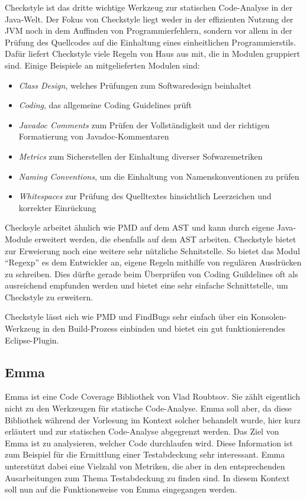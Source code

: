 Checkstyle ist das dritte wichtige Werkzeug zur statischen Code-Analyse in der Java-Welt. Der Fokus von Checkstyle liegt weder in der effizienten Nutzung der JVM noch in dem Auffinden von Programmierfehlern, sondern vor allem in der Prüfung des Quellcodes auf die Einhaltung eines einheitlichen Programmierstils. 
Dafür liefert Checkstyle viele Regeln von Haus aus mit, die in Modulen gruppiert sind. Einige Beispiele an mitgelieferten Modulen sind:
\begin{itemize}
\item \textit{Class Design}, welches Prüfungen zum Softwaredesign beinhaltet
\item \textit{Coding}, das allgemeine Coding Guidelines prüft
\item \textit{Javadoc Comments} zum Prüfen der Vollständigkeit und der richtigen Formatierung von Javadoc-Kommentaren
\item \textit{Metrics} zum Sicherstellen der  Einhaltung diverser Sofwaremetriken
\item \textit{Naming Conventions}, um die Einhaltung von Namenskonventionen zu prüfen
\item \textit{Whitespaces} zur Prüfung des Quelltextes hinsichtlich Leerzeichen und korrekter Einrückung
\end{itemize}
Checksyle arbeitet ähnlich wie PMD auf dem AST und kann durch eigene Java-Module erweitert werden, die ebenfalls auf dem AST arbeiten. Checkstyle bietet zur Erweierung noch eine weitere sehr nützliche Schnitstelle. So bietet das Modul ``Regexp'' es dem Entwickler an, eigene Regeln mithilfe von regulären Ausdrücken zu schreiben. Dies dürfte gerade beim Überprüfen von Coding Guildelines oft als ausreichend empfunden werden und bietet eine sehr einfache Schnittstelle, um Checkstyle zu erweitern.

Checkstyle lässt sich wie PMD und FindBugs sehr einfach über ein Konsolen-Werkzeug in den Build-Prozess einbinden und bietet ein gut funktionierendes Eclipse-Plugin.


\subsection{Emma}

Emma ist eine Code Coverage Bibliothek von Vlad Roubtsov. Sie zählt eigentlich nicht zu den Werkzeugen für statische Code-Analyse. Emma soll aber, da diese Bibliothek während der Vorlesung im Kontext solcher behandelt wurde, hier kurz erläutert und zur statischen Code-Analyse abgegrenzt werden. 
Das Ziel von Emma ist zu analysieren, welcher Code durchlaufen wird. Diese Information ist zum Beispiel für die Ermittlung einer Testabdeckung sehr interessant. Emma unterstützt dabei eine Vielzahl von Metriken, die aber in den entsprechenden Ausarbeitungen zum Thema Testabdeckung zu finden sind. In diesem Kontext soll nun auf die Funktionsweise von Emma eingegangen werden.

